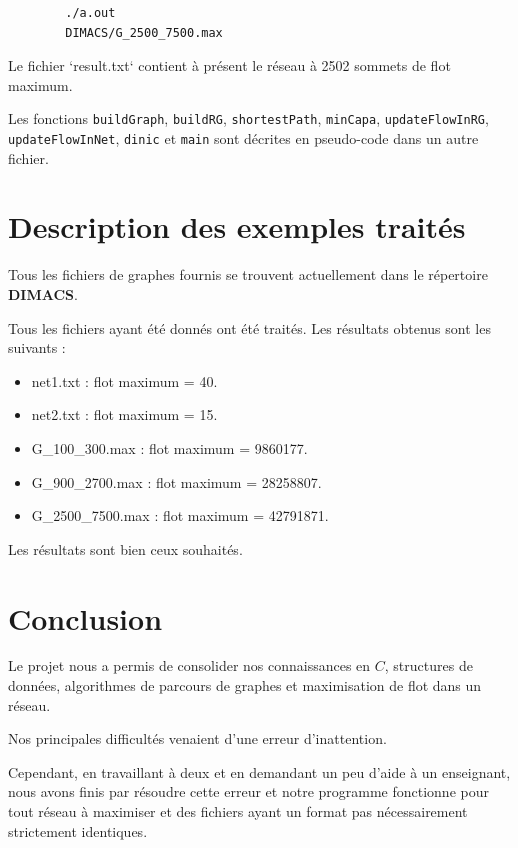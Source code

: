 \documentclass[11pt, a4paper]{report}
\begin{document}
	\begin{lstlisting}
		./a.out
		DIMACS/G_2500_7500.max
	\end{lstlisting}
	Le fichier `result.txt` contient à présent le réseau à 2502 sommets de flot maximum.

	Les fonctions \verb|buildGraph|, \verb|buildRG|, \verb|shortestPath|, \verb|minCapa|, \verb|updateFlowInRG|, \verb|updateFlowInNet|, \verb|dinic| et \verb|main| sont décrites en pseudo-code dans un autre fichier.




	\chapter{Description des exemples traités}

	Tous les fichiers de graphes fournis se trouvent actuellement dans le répertoire \textbf{DIMACS}.

	Tous les fichiers ayant été donnés ont été traités. Les résultats obtenus sont les suivants :
	\begin{itemize}
        \item net1.txt : flot maximum = 40.
        \item net2.txt : flot maximum = 15.
        \item G\_100\_300.max : flot maximum = 9860177.
        \item G\_900\_2700.max : flot maximum = 28258807.
        \item G\_2500\_7500.max : flot maximum = 42791871.
	\end{itemize}

	Les résultats sont bien ceux souhaités.


	\chapter*{Conclusion}
	
	Le projet nous a permis de consolider nos connaissances en $C$, structures de données, algorithmes de parcours de graphes et maximisation de flot dans un réseau.
	
	Nos principales difficultés venaient d'une erreur d'inattention.
	
	Cependant, en travaillant à deux et en demandant un peu d'aide à un enseignant, nous avons finis par résoudre cette erreur et notre programme fonctionne pour tout réseau à maximiser et des fichiers ayant un format pas nécessairement strictement identiques.
	
\end{document}
